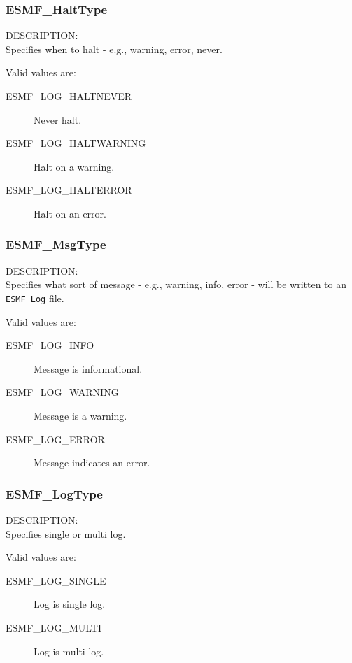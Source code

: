 

\subsubsection{ESMF\_HaltType}

\label{opt:Halttype}
{\sf DESCRIPTION:\\}
Specifies when to halt - e.g., warning, error,
never.

Valid values are:
\begin{description}
   \item [ESMF\_LOG\_HALTNEVER] 
         Never halt.
   \item [ESMF\_LOG\_HALTWARNING]
         Halt on a warning.
   \item [ESMF\_LOG\_HALTERROR]
         Halt on an error.
\end{description}

\subsubsection{ESMF\_MsgType}

\label{opt:msgtype}
{\sf DESCRIPTION:\\}
Specifies what sort of message - e.g., warning, info,
error - will be written to an {\tt ESMF\_Log} file.

Valid values are:
\begin{description}
   \item [ESMF\_LOG\_INFO] 
         Message is informational.
   \item [ESMF\_LOG\_WARNING]
         Message is a warning.
   \item [ESMF\_LOG\_ERROR]
         Message indicates an error.
\end{description}

\subsubsection{ESMF\_LogType}

\label{opt:logtype}
{\sf DESCRIPTION:\\}
Specifies single or multi log.

Valid values are:
\begin{description}
   \item [ESMF\_LOG\_SINGLE] 
         Log is single log.
   \item [ESMF\_LOG\_MULTI]
         Log is multi log.
\end{description}





